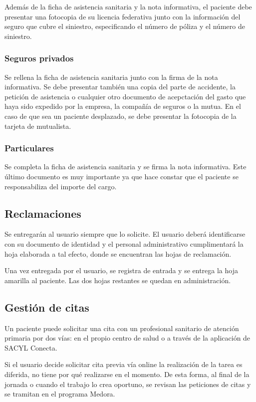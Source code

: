Además de la ficha de asistencia sanitaria y la nota informativa, el paciente debe presentar una fotocopia de su licencia federativa junto con la información del seguro que cubre el siniestro, especificando el número de póliza y el número de siniestro.

\subsubsection{Seguros privados}

Se rellena la ficha de asistencia sanitaria junto con la firma de la nota informativa.
Se debe presentar también una copia del parte de accidente, la petición de asistencia o cualquier otro documento de acepctación del gasto que haya sido expedido por la empresa, la compañía de seguros o la mutua.
En el caso de que sea un paciente desplazado, se debe presentar la fotocopia de la tarjeta de mutualista.

\subsubsection{Particulares}

Se completa la ficha de asistencia sanitaria y se firma la nota informativa. Este último documento es muy importante ya que hace constar que el paciente se responsabiliza del importe del cargo.

\subsection{Reclamaciones}

Se entregarán al usuario siempre que lo solicite. El usuario deberá identificarse con su documento de identidad y el personal administrativo cumplimentará la hoja elaborada a tal efecto, donde se encuentran las hojas de reclamación.

Una vez entregada por el usuario, se registra de entrada y se entrega la hoja amarilla al paciente. Las dos hojas restantes se quedan en administración.

\subsection{Gestión de citas}

Un paciente puede solicitar una cita con un profesional sanitario de atención primaria por dos vías: en el propio centro de salud o a través de la aplicación de SACYL Conecta.

Si el usuario decide solicitar cita previa vía online la realización de la tarea es diferida, no tiene por qué realizarse en el momento. De esta forma, al final de la jornada o cuando el trabajo lo crea oportuno, se revisan las peticiones de citas y se tramitan en el programa Medora.

